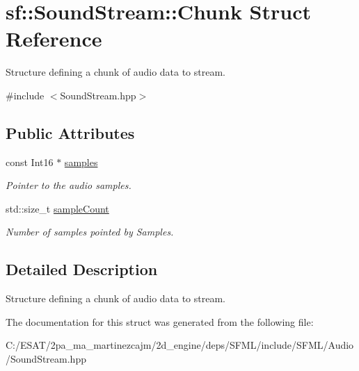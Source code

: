 \hypertarget{structsf_1_1_sound_stream_1_1_chunk}{}\section{sf\+:\+:Sound\+Stream\+:\+:Chunk Struct Reference}
\label{structsf_1_1_sound_stream_1_1_chunk}


Structure defining a chunk of audio data to stream.  




{\ttfamily \#include $<$Sound\+Stream.\+hpp$>$}

\subsection*{Public Attributes}
\begin{DoxyCompactItemize}
\item 
\mbox{\label{structsf_1_1_sound_stream_1_1_chunk_aa3b84d69adbe663a17a7671626076df4}} 
const Int16 $\ast$ \hyperlink{structsf_1_1_sound_stream_1_1_chunk_aa3b84d69adbe663a17a7671626076df4}{samples}
\begin{DoxyCompactList}\small\item\em Pointer to the audio samples. \end{DoxyCompactList}\item 
\mbox{\label{structsf_1_1_sound_stream_1_1_chunk_af47f5d94012acf8b11f056ba77aff97a}} 
std\+::size\+\_\+t \hyperlink{structsf_1_1_sound_stream_1_1_chunk_af47f5d94012acf8b11f056ba77aff97a}{sample\+Count}
\begin{DoxyCompactList}\small\item\em Number of samples pointed by Samples. \end{DoxyCompactList}\end{DoxyCompactItemize}


\subsection{Detailed Description}
Structure defining a chunk of audio data to stream. 

The documentation for this struct was generated from the following file\+:\begin{DoxyCompactItemize}
\item 
C\+:/\+E\+S\+A\+T/2pa\+\_\+ma\+\_\+martinezcajm/2d\+\_\+engine/deps/\+S\+F\+M\+L/include/\+S\+F\+M\+L/\+Audio/Sound\+Stream.\+hpp\end{DoxyCompactItemize}
